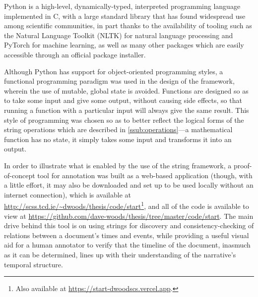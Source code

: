 \documentclass[a4paper,12pt,leqno]{article}
\begin{document}
Python is a high-level, dynamically-typed, interpreted programming language implemented in C, with a large standard library that has found widespread use among scientific communities, in part thanks to the availability of tooling such as the Natural Language Toolkit (NLTK) \citep{Bird2009} for natural language processing and PyTorch \citep{ketkar2017introduction} for machine learning, as well as many other packages which are easily accessible through an official package installer.

Although Python has support for object-oriented programming styles, a functional programming paradigm was used in the design of the framework, wherein the use of mutable, global state is avoided. Functions are designed so as to take some input and give some output, without causing side effects, so that running a function with a particular input will always give the same result. This style of programming was chosen so as to better reflect the logical forms of the string operations which are described in \cref{ssub:operations}---a mathematical function has no state, it simply takes some input and transforms it into an output.

In order to illustrate what is enabled by the use of the string framework, a proof-of-concept tool for annotation was built as a web-based application (though, with a little effort, it may also be downloaded and set up to be used locally without an internet connection), which is available at \url{http://scss.tcd.ie/~dwoods/thesis/code/start}\footnote{Also available at \url{https://start-dwoodscs.vercel.app}.}, and all of the code is available to view at \url{https://github.com/dave-woods/thesis/tree/master/code/start}. The main drive behind this tool is on using strings for discovery and consistency-checking of relations between a document's times and events, while providing a useful visual aid for a human annotator to verify that the timeline of the document, inasmuch as it can be determined, lines up with their understanding of the narrative's temporal structure.
\end{document}
